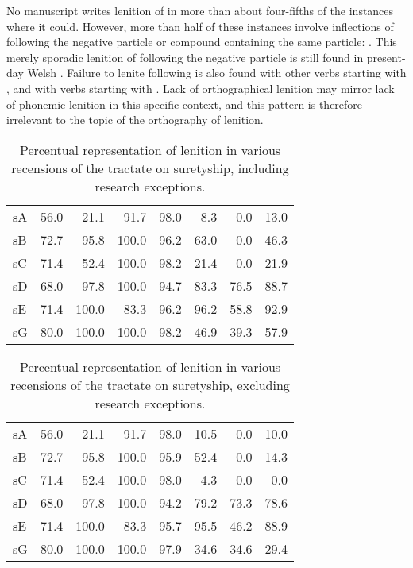 No manuscript writes lenition of  in more than about four-fifths of the instances where it could. However, more than half of these instances involve inflections of  following the negative particle  or compound containing the same particle: . This merely sporadic lenition of  following the negative particle is still found in present-day Welsh \autocite[695]{thomas_gramadeg_1996}. Failure to lenite following  is also found with other verbs starting with , and with verbs starting with . Lack of orthographical lenition may mirror lack of phonemic lenition in this specific context, and this pattern is therefore irrelevant to the topic of the orthography of lenition. 


\begin{table}[h]
  \centering
    \begin{tabular}{lddddddd}
    \toprule
     &  &  &  &  &  &  &  \\
    \midrule
    \gls{sA} & 56.0 & 21.1 & 91.7 & 98.0 & 8.3 & 0.0 & 13.0 \\
    \gls{sB} & 72.7 & 95.8 & 100.0 & 96.2 & 63.0 & 0.0 & 46.3 \\
    \gls{sC} & 71.4 & 52.4 & 100.0 & 98.2 & 21.4 & 0.0 & 21.9 \\
    \gls{sD} & 68.0 & 97.8 & 100.0 & 94.7 & 83.3 & 76.5 & 88.7 \\
    \gls{sE} & 71.4 & 100.0 & 83.3 & 96.2 & 96.2 & 58.8 & 92.9 \\
    \gls{sG} & 80.0 & 100.0 & 100.0 & 98.2 & 46.9 & 39.3 & 57.9 \\
    \bottomrule
    \end{tabular}%
    \caption{Percentual representation of lenition in various recensions of the tractate on suretyship, including research exceptions.}
    \label{tab:lenlawcountryincre}%
\end{table}%


\begin{table}[h]
  \centering
    \begin{tabular}{lddddddd}
    \toprule
       &  &  &  &  &  &  &  \\
      \midrule
      \gls{sA} & 56.0 & 21.1 & 91.7 & 98.0 & 10.5 & 0.0 & 10.0 \\
      \gls{sB} & 72.7 & 95.8 & 100.0 & 95.9 & 52.4 & 0.0 & 14.3 \\
      \gls{sC} & 71.4 & 52.4 & 100.0 & 98.0 & 4.3 & 0.0 & 0.0 \\
      \gls{sD} & 68.0 & 97.8 & 100.0 & 94.2 & 79.2 & 73.3 & 78.6 \\
      \gls{sE} & 71.4 & 100.0 & 83.3 & 95.7 & 95.5 & 46.2 & 88.9 \\
      \gls{sG} & 80.0 & 100.0 & 100.0 & 97.9 & 34.6 & 34.6 & 29.4 \\
    \bottomrule
    \end{tabular}%
    \caption{Percentual representation of lenition in various recensions of the tractate on suretyship, excluding research exceptions.}
    \label{tab:lenlawcountryexcre}%
  \end{table}%

